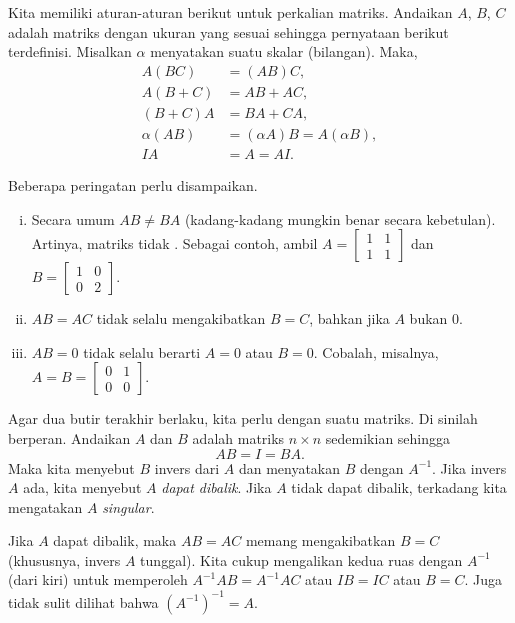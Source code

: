 \pagebreak[2]
Kita memiliki aturan-aturan berikut untuk perkalian matriks.  Andaikan
$A$, $B$, $C$ adalah matriks dengan ukuran yang sesuai sehingga pernyataan berikut
terdefinisi.  Misalkan $\alpha$ menyatakan suatu skalar (bilangan).
Maka,
\begin{align*}
A(BC) & = (AB)C, \\
A(B+C) & = AB + AC, \\
(B+C)A & = BA + CA, \\
\alpha(AB) & = (\alpha A)B = A(\alpha B), \\
IA & = A = AI .
\end{align*}

\pagebreak[2]
Beberapa peringatan perlu disampaikan.
\begin{enumerate}[(i)]
\item Secara umum $AB \neq BA$ (kadang-kadang mungkin benar secara kebetulan).  Artinya,
matriks tidak .
Sebagai contoh, ambil
$A = \left[ \begin{smallmatrix} 1 & 1 \\ 1 & 1 \end{smallmatrix} \right]$
dan
$B = \left[ \begin{smallmatrix} 1 & 0 \\ 0 & 2 \end{smallmatrix} \right]$.
\item $AB = AC$ tidak selalu mengakibatkan $B=C$, bahkan jika $A$ bukan 0.
\item $AB = 0$ tidak selalu berarti $A=0$ atau $B=0$.
Cobalah, misalnya,
$A = B = \left[ \begin{smallmatrix} 0 & 1 \\ 0 & 0 \end{smallmatrix}
\right]$.
\end{enumerate}

Agar dua butir terakhir berlaku, kita perlu  dengan
suatu matriks.  Di sinilah \emph{} berperan.
Andaikan $A$ dan $B$ adalah matriks $n \times n$ sedemikian sehingga
\begin{equation*}
AB = I = BA .
\end{equation*}
Maka kita menyebut $B$ invers dari $A$ dan menyatakan $B$ dengan $A^{-1}$.
Jika invers $A$ ada, kita menyebut $A$
\emph{dapat dibalik}.
Jika $A$ tidak dapat dibalik, terkadang kita mengatakan $A$
\emph{singular}.

Jika $A$ dapat dibalik, maka $AB = AC$ memang mengakibatkan
$B = C$ (khususnya, invers $A$ tunggal).
Kita cukup mengalikan kedua ruas dengan $A^{-1}$ (dari kiri) untuk memperoleh
$A^{-1}AB = A^{-1}AC$ atau $IB=IC$ atau $B=C$.
Juga tidak sulit dilihat bahwa ${(A^{-1})}^{-1} = A$.

